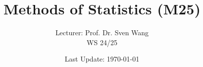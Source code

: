 
\titlehead
{\centering
\texttt{[image: bilder/hu-logo]}
}


\subject{\sc Humboldt-Universität zu Berlin}
\title{Methods of Statistics (M25)}
\author{Lecturer: {Prof. Dr. Sven Wang}\\
WS 24/25}
\date{Last Update: \today}



\maketitle	%



